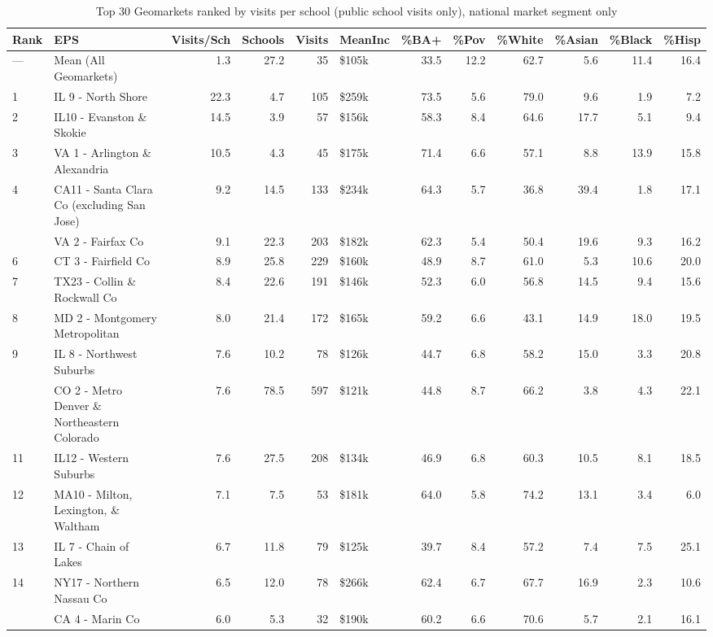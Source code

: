 \begin{table}
\centering
\caption{Top 30 Geomarkets ranked by visits per school (public school visits only), national market segment only}
\centering
\begin{tabular}[t]{llrrrlrrrrrr}
\toprule
Rank & EPS & Visits/Sch & Schools & Visits & MeanInc & \%BA+ & \%Pov & \%White & \%Asian & \%Black & \%Hisp\\
\midrule
— & Mean (All Geomarkets) & 1.3 & 27.2 & 35 & \$105k & 33.5 & 12.2 & 62.7 & 5.6 & 11.4 & 16.4\\
1 & IL 9 - North Shore & 22.3 & 4.7 & 105 & \$259k & 73.5 & 5.6 & 79.0 & 9.6 & 1.9 & 7.2\\
2 & IL10 - Evanston \& Skokie & 14.5 & 3.9 & 57 & \$156k & 58.3 & 8.4 & 64.6 & 17.7 & 5.1 & 9.4\\
3 & VA 1 - Arlington \& Alexandria & 10.5 & 4.3 & 45 & \$175k & 71.4 & 6.6 & 57.1 & 8.8 & 13.9 & 15.8\\
4 & CA11 - Santa Clara Co (excluding San Jose) & 9.2 & 14.5 & 133 & \$234k & 64.3 & 5.7 & 36.8 & 39.4 & 1.8 & 17.1\\
\addlinespace
5 & VA 2 - Fairfax Co & 9.1 & 22.3 & 203 & \$182k & 62.3 & 5.4 & 50.4 & 19.6 & 9.3 & 16.2\\
6 & CT 3 - Fairfield Co & 8.9 & 25.8 & 229 & \$160k & 48.9 & 8.7 & 61.0 & 5.3 & 10.6 & 20.0\\
7 & TX23 - Collin \& Rockwall Co & 8.4 & 22.6 & 191 & \$146k & 52.3 & 6.0 & 56.8 & 14.5 & 9.4 & 15.6\\
8 & MD 2 - Montgomery Metropolitan & 8.0 & 21.4 & 172 & \$165k & 59.2 & 6.6 & 43.1 & 14.9 & 18.0 & 19.5\\
9 & IL 8 - Northwest Suburbs & 7.6 & 10.2 & 78 & \$126k & 44.7 & 6.8 & 58.2 & 15.0 & 3.3 & 20.8\\
\addlinespace
10 & CO 2 - Metro Denver \& Northeastern Colorado & 7.6 & 78.5 & 597 & \$121k & 44.8 & 8.7 & 66.2 & 3.8 & 4.3 & 22.1\\
11 & IL12 - Western Suburbs & 7.6 & 27.5 & 208 & \$134k & 46.9 & 6.8 & 60.3 & 10.5 & 8.1 & 18.5\\
12 & MA10 - Milton, Lexington, \& Waltham & 7.1 & 7.5 & 53 & \$181k & 64.0 & 5.8 & 74.2 & 13.1 & 3.4 & 6.0\\
13 & IL 7 - Chain of Lakes & 6.7 & 11.8 & 79 & \$125k & 39.7 & 8.4 & 57.2 & 7.4 & 7.5 & 25.1\\
14 & NY17 - Northern Nassau Co & 6.5 & 12.0 & 78 & \$266k & 62.4 & 6.7 & 67.7 & 16.9 & 2.3 & 10.6\\
\addlinespace
15 & CA 4 - Marin Co & 6.0 & 5.3 & 32 & \$190k & 60.2 & 6.6 & 70.6 & 5.7 & 2.1 & 16.1\\

\end{tabular}
\end{table}
